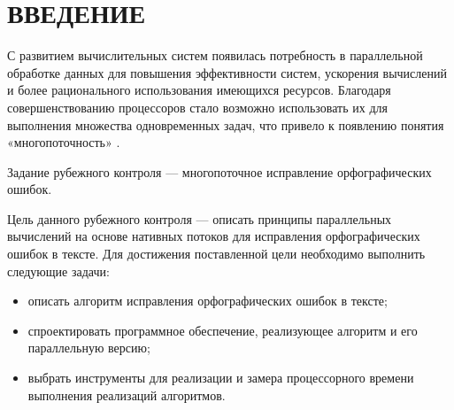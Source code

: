 \chapter*{ВВЕДЕНИЕ}

С развитием вычислительных систем появилась потребность в параллельной обработке данных для повышения эффективности систем, ускорения вычислений и более рационального использования имеющихся ресурсов. 
Благодаря совершенствованию процессоров стало возможно использовать их для выполнения множества одновременных задач, что привело к появлению понятия «многопоточность» \cite{intro}.

Задание рубежного контроля --- многопоточное исправление орфографических ошибок.

Цель данного рубежного контроля --- описать принципы параллельных вычислений на основе нативных потоков для исправления орфографических ошибок в тексте. Для достижения поставленной цели необходимо выполнить следующие задачи:
\begin{itemize}
	\item описать алгоритм исправления орфографических ошибок в тексте;
	\item спроектировать программное обеспечение, реализующее алгоритм и его параллельную версию;
	\item выбрать инструменты для реализации и замера процессорного времени
	выполнения реализаций алгоритмов.
\end{itemize}
